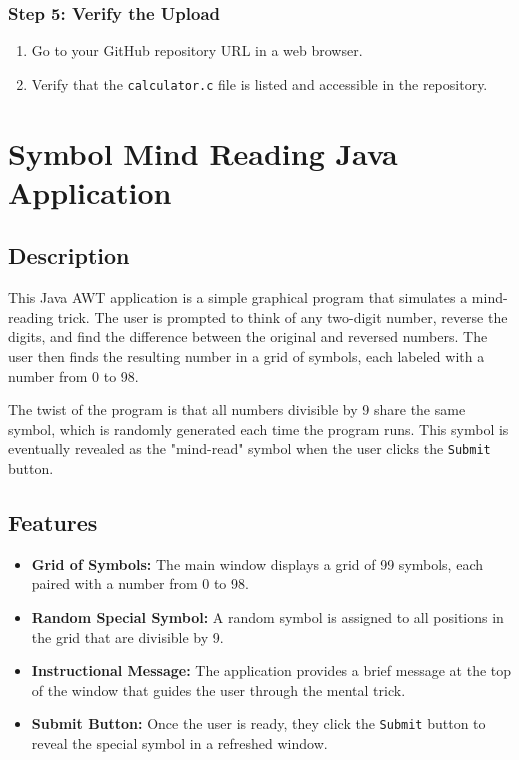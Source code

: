 \documentclass[a4paper,15pt]{article}
\begin{document}
\begin{itemize}[leftmargin=1.5cm]
\subsubsection{Step 5: Verify the Upload}
\begin{enumerate}
    \item Go to your GitHub repository URL in a web browser.
    \item Verify that the \texttt{calculator.c} file is listed and accessible in the repository.
\end{enumerate}


\section{Symbol Mind Reading Java Application}

\subsection{Description}
This Java AWT application is a simple graphical program that simulates a mind-reading trick. The user is prompted to think of any two-digit number, reverse the digits, and find the difference between the original and reversed numbers. The user then finds the resulting number in a grid of symbols, each labeled with a number from 0 to 98.

The twist of the program is that all numbers divisible by 9 share the same symbol, which is randomly generated each time the program runs. This symbol is eventually revealed as the "mind-read" symbol when the user clicks the \texttt{Submit} button.

\subsection{Features}
\begin{itemize}
    \item \textbf{Grid of Symbols:} The main window displays a grid of 99 symbols, each paired with a number from 0 to 98.
    \item \textbf{Random Special Symbol:} A random symbol is assigned to all positions in the grid that are divisible by 9.
    \item \textbf{Instructional Message:} The application provides a brief message at the top of the window that guides the user through the mental trick.
    \item \textbf{Submit Button:} Once the user is ready, they click the \texttt{Submit} button to reveal the special symbol in a refreshed window.
\end{itemize}


\end{itemize}
\end{document}
